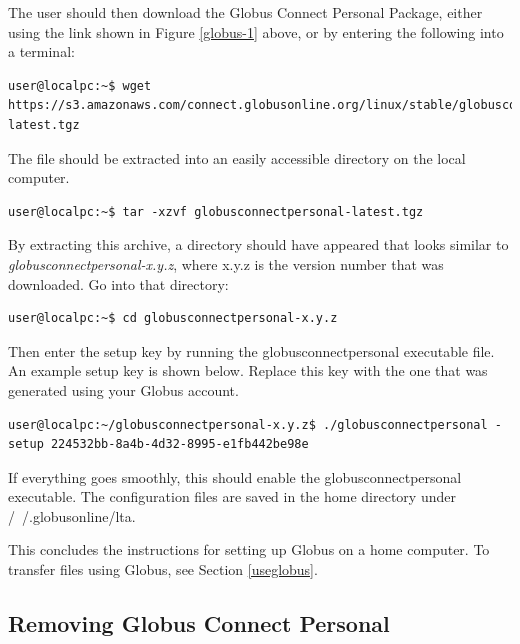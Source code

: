 \documentclass[12pt]{article}
\begin{document}
\quad The user should then download the Globus Connect Personal Package, either using the link shown in Figure \ref{globus-1} above, or by entering the following into a terminal:

\begin{lstlisting}[numbers=none]
user@localpc:~$ wget https://s3.amazonaws.com/connect.globusonline.org/linux/stable/globusconnectpersonal-latest.tgz
\end{lstlisting}

\quad The file should be extracted into an easily accessible directory on the local computer.

\begin{lstlisting}[numbers=none]
user@localpc:~$ tar -xzvf globusconnectpersonal-latest.tgz
\end{lstlisting}

\quad By extracting this archive, a directory should have appeared that looks similar to \textit{globusconnectpersonal-x.y.z}, where x.y.z is the version number that was downloaded. Go into that directory:

\begin{lstlisting}[numbers=none]
user@localpc:~$ cd globusconnectpersonal-x.y.z
\end{lstlisting}

\quad Then enter the setup key by running the globusconnectpersonal executable file. An example setup key is shown below. Replace this key with the one that was generated using your Globus account.

\begin{lstlisting}[numbers=none]
user@localpc:~/globusconnectpersonal-x.y.z$ ./globusconnectpersonal -setup 224532bb-8a4b-4d32-8995-e1fb442be98e
\end{lstlisting}

If everything goes smoothly, this should enable the globusconnectpersonal executable. The configuration files are saved in the home directory under /~/.globusonline/lta.

\quad This concludes the instructions for setting up Globus on a home computer. To transfer files using Globus, see Section \ref{useglobus}.

\subsection{Removing Globus Connect Personal}
\end{document}
